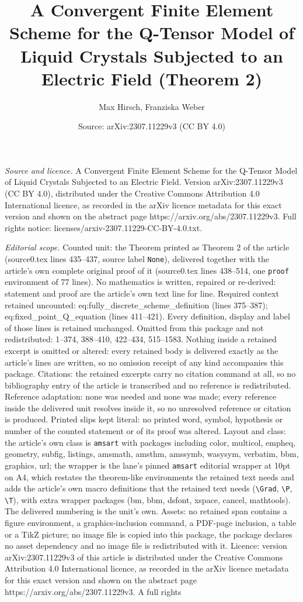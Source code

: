 \documentclass[10pt,a4paper]{amsart}
\title[A Convergent Finite Element Scheme for the Q-Tensor Model of]{A Convergent Finite Element Scheme for the Q-Tensor Model of Liquid Crystals Subjected to an Electric Field (Theorem 2)}
\author{Max Hirsch, Franziska Weber}
\date{Source: arXiv:2307.11229v3 (CC BY 4.0)}
\begin{document}
\maketitle

\noindent\emph{Source and licence.} A Convergent Finite Element Scheme for the Q-Tensor Model of Liquid Crystals Subjected to an Electric Field. Version arXiv:2307.11229v3 (CC BY 4.0), distributed under the Creative Commons Attribution 4.0 International licence, as recorded in the arXiv licence metadata for this exact version and shown on the abstract page https://arxiv.org/abs/2307.11229v3. Full rights notice: licenses/arxiv-2307.11229-CC-BY-4.0.txt.\par\smallskip

\noindent\textit{Editorial scope.} Counted unit: the Theorem printed as Theorem 2 of the article (source0.tex lines 435--437, source label \texttt{None}), delivered together with the article's own complete original proof of it (source0.tex lines 438--514, one \texttt{proof} environment of 77 lines). No mathematics is written, repaired or re-derived: statement and proof are the article's own text line for line. Required context retained uncounted: eq:fully\_discrete\_scheme\_definition (lines 375--387); eq:fixed\_point\_Q\_equation (lines 411--421). Every definition, display and label of those lines is retained unchanged. Omitted from this package and not redistributed: 1--374, 388--410, 422--434, 515--1583. Nothing inside a retained excerpt is omitted or altered: every retained body is delivered exactly as the article's lines are written, so no omission receipt of any kind accompanies this package. Citations: the retained excerpts carry no citation command at all, so no bibliography entry of the article is transcribed and no reference is redistributed. Reference adaptation: none was needed and none was made; every reference inside the delivered unit resolves inside it, so no unresolved reference or citation is produced. Printed slips kept literal: no printed word, symbol, hypothesis or number of the counted statement or of its proof was altered. Layout and class: the article's own class is \texttt{amsart} with packages including color, multicol, empheq, geometry, subfig, listings, amsmath, amsthm, amssymb, wasysym, verbatim, bbm, graphics, url; the wrapper is the lane's pinned \texttt{amsart} editorial wrapper at 10pt on A4, which restates the theorem-like environments the retained text needs and adds the article's own macro definitions that the retained text needs (\texttt{\textbackslash Grad}, \texttt{\textbackslash P}, \texttt{\textbackslash T}), with extra wrapper packages (bm, bbm, dsfont, xspace, cancel, mathtools). The delivered numbering is the unit's own. Assets: no retained span contains a figure environment, a graphics-inclusion command, a PDF-page inclusion, a table or a TikZ picture; no image file is copied into this package, the package declares no asset dependency and no image file is redistributed with it. Licence: version arXiv:2307.11229v3 of this article is distributed under the Creative Commons Attribution 4.0 International licence, as recorded in the arXiv licence metadata for this exact version and shown on the abstract page https://arxiv.org/abs/2307.11229v3. A full rights 
\end{document}
